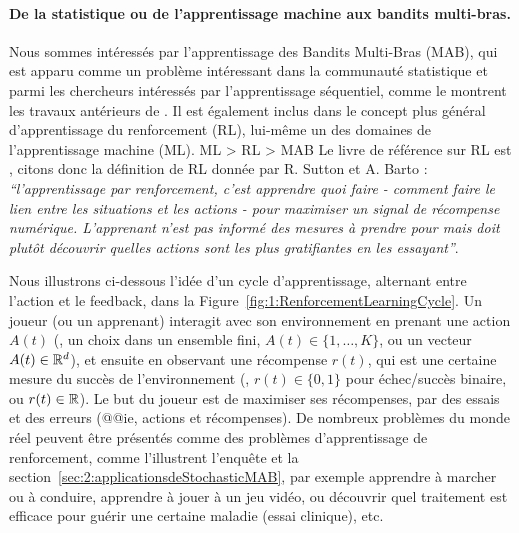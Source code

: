 \begin{resume_fr}
\paragraph{De la statistique ou de l'apprentissage machine aux bandits multi-bras.}
%
Nous sommes intéressés par l'apprentissage des Bandits Multi-Bras (MAB),
qui est apparu comme un problème intéressant dans la communauté statistique et parmi les chercheurs intéressés par l'apprentissage séquentiel, comme le montrent les travaux antérieurs de \cite{Thompson33,Robbins52,LaiRobbins85}.
Il est également inclus dans le concept plus général d'apprentissage du renforcement (RL), lui-même un des domaines de l'apprentissage machine (ML).
ML > RL > MAB
%
Le livre de référence sur RL est \cite{SuttonBarto2018}, citons donc la définition de RL donnée par R. Sutton et A. Barto :
\emph{``l'apprentissage par renforcement, c'est apprendre quoi faire - comment faire le lien entre les situations et les actions -
pour maximiser un signal de récompense numérique. L'apprenant n'est pas informé des mesures à prendre pour
mais doit plutôt découvrir quelles actions sont les plus gratifiantes en les essayant''}.


Nous illustrons ci-dessous l'idée d'un cycle d'apprentissage, alternant entre l'action et le feedback,
dans la Figure~\ref{fig:1:RenforcementLearningCycle}.
Un joueur (ou un apprenant) interagit avec son environnement en prenant une action $A(t)$ (\eg, un choix dans un ensemble fini, $A(t)\in\{1,\dots,K\}$, ou un vecteur $A(t)\in\mathbb{R}^d$), et ensuite en observant une récompense $r(t)$, qui est une certaine mesure du succès de l'environnement (\eg, $r(t)\in\{0,1\}$ pour échec/succès binaire, ou $r(t)\in\mathbb{R}$).
Le but du joueur est de maximiser ses récompenses, par des essais et des erreurs (@@ie, actions et récompenses).
De nombreux problèmes du monde réel peuvent être présentés comme des problèmes d'apprentissage de renforcement, comme l'illustrent l'enquête \cite{bouneffouf2019survey} et la section~\ref{sec:2:applicationsdeStochasticMAB}, par exemple apprendre à marcher ou à conduire, apprendre à jouer à un jeu vidéo, ou découvrir quel traitement est efficace pour guérir une certaine maladie (essai clinique), etc.



\end{resume_fr}
